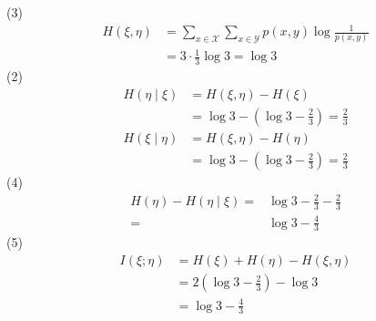 \begin{solution}
$$$$
(3)
$$
\begin{aligned}
H(\xi, \eta) & =\sum_{x \in \mathscr{X}} \sum_{x \in \mathscr{Y}} p(x, y) \log \frac{1}{p(x, y)} \\
& =3 \cdot \frac{1}{3} \log 3=\log 3
\end{aligned}
$$
(2)
$$
\begin{aligned}
H(\eta \mid \xi) & =H(\xi, \eta)-H(\xi) \\
& =\log 3-\left(\log 3-\frac{2}{3}\right)=\frac{2}{3} \\
H(\xi \mid \eta) & =H(\xi, \eta)-H(\eta) \\
& =\log 3-\left(\log 3-\frac{2}{3}\right)=\frac{2}{3}
\end{aligned}
$$
(4)
$$
\begin{aligned}
H(\eta)-H(\eta \mid \xi) 
= & \log 3-\frac{2}{3}-\frac{2}{3} \\
= & \log 3-\frac{4}{3}
\end{aligned}
$$
(5)
$$
\begin{aligned}
I(\xi ; \eta) & =H(\xi)+H(\eta)-H(\xi, \eta) \\
& =2\left(\log 3-\frac{2}{3}\right)-\log 3 \\
& =\log 3-\frac{4}{3}
\end{aligned}
$$

 \end{solution}

